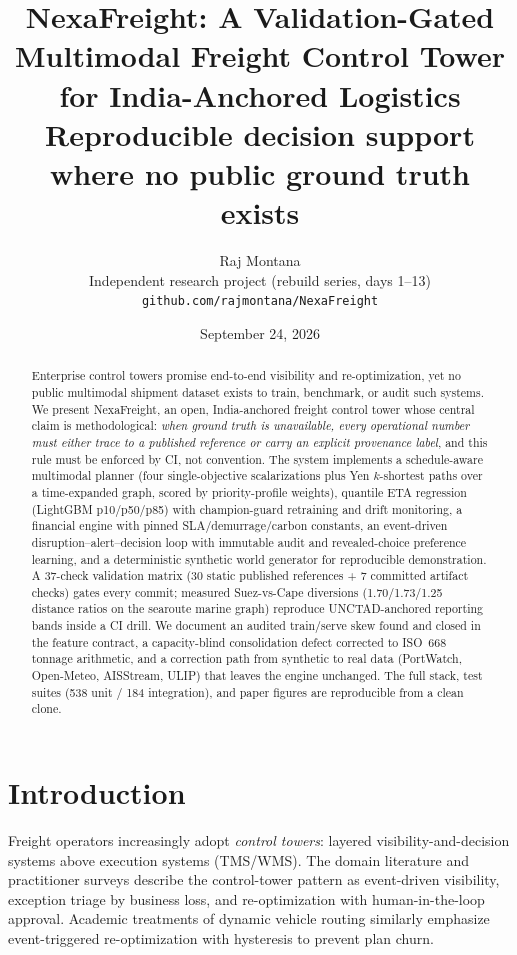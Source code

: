 \documentclass[11pt]{article}
\title{NexaFreight: A Validation-Gated Multimodal Freight Control Tower\\
for India-Anchored Logistics\\[4pt]
\large Reproducible decision support where no public ground truth exists}
\author{Raj Montana\\
\small Independent research project (rebuild series, days 1--13)\\
\small \texttt{github.com/rajmontana/NexaFreight}}
\date{September 24, 2026}
\begin{document}
\maketitle

\begin{abstract}
Enterprise control towers promise end-to-end visibility and re-optimization,
yet no public multimodal shipment dataset exists to train, benchmark, or
audit such systems. We present NexaFreight, an open, India-anchored freight
control tower whose central claim is methodological: \emph{when ground truth
is unavailable, every operational number must either trace to a published
reference or carry an explicit provenance label}, and this rule must be
enforced by CI, not convention. The system implements a schedule-aware
multimodal planner (four single-objective scalarizations plus Yen
$k$-shortest paths over a time-expanded graph, scored by priority-profile
weights), quantile ETA regression (LightGBM p10/p50/p85) with
champion-guard retraining and drift monitoring, a financial engine with
pinned SLA/demurrage/carbon constants, an event-driven
disruption--alert--decision loop with immutable audit and revealed-choice
preference learning, and a deterministic synthetic world generator for
reproducible demonstration. A 37-check validation matrix (30 static
published references + 7 committed artifact checks) gates every commit;
measured Suez-vs-Cape diversions (1.70/1.73/1.25 distance ratios on the
searoute marine graph) reproduce UNCTAD-anchored reporting bands inside a
CI drill. We document an audited train/serve skew found and closed in the
feature contract, a capacity-blind consolidation defect corrected to
ISO~668 tonnage arithmetic, and a correction path from synthetic to real
data (PortWatch, Open-Meteo, AISStream, ULIP) that leaves the engine
unchanged. The full stack, test suites (538 unit / 184 integration), and
paper figures are reproducible from a clean clone.
\end{abstract}

\section{Introduction}

Freight operators increasingly adopt \emph{control towers}: layered
visibility-and-decision systems above execution systems (TMS/WMS). The
domain literature and practitioner surveys describe the control-tower
pattern as event-driven visibility, exception triage by business loss,
and re-optimization with human-in-the-loop approval. Academic treatments
of dynamic vehicle routing similarly emphasize event-triggered
re-optimization with hysteresis to prevent plan churn.
\end{document}
